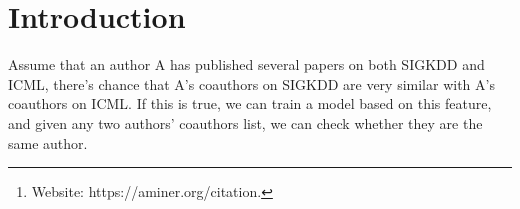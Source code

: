 \documentclass{sigkddExp}
\begin{document}
\author{
%
\alignauthor Fang Zhang \\
       \\
}
\date{11 March 2016}
\maketitle
\begin{abstract}
This paper describes how I conduct the de-anonymization on
authors using their coauthor lists as features. The main model
I use here is Multi Layer Perceptron model (MLP model). The
authors and their coauthors I use to train and test are extracted
from two conferences from the DBLP-Citation-network-V7\footnote{
Website: https://aminer.org/citation.} dataset.~\cite{Tang:08KDD} I use
5-fold cross validation to test the dataset. And the average
precision, recall, and F1 score I get on the test dataset are
all over 98\%.

\end{abstract}

\section{Introduction}
Assume that an author A has published several papers on both
SIGKDD and ICML, there's chance that A's coauthors on SIGKDD
are very similar with A's coauthors on ICML. If this is true,
we can train a model based on this feature, and given any two
authors' coauthors list, we can check whether they are the same
author.
\end{document}
